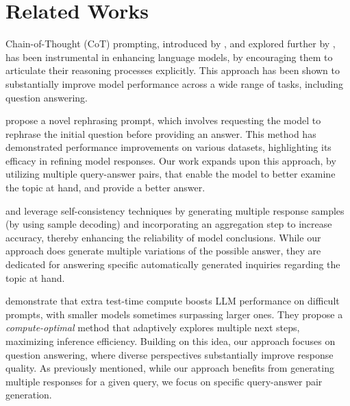 \section{Related Works}
\label{sec:related-works}

Chain-of-Thought (CoT) prompting, introduced by \citet{wu-etal-2023-chain}, and explored further by \citet{weiChainofThoughtPromptingElicits2023}, has been instrumental in enhancing language models, by encouraging them to articulate their reasoning processes explicitly. This approach has been shown to substantially improve model performance across a wide range of tasks, including question answering. 

\citet{dengRephraseRespondLet2024} propose a novel rephrasing prompt, which involves requesting the model to rephrase the initial question before providing an answer. This method has demonstrated performance improvements on various datasets, highlighting its efficacy in refining model responses. Our work expands upon this approach, by utilizing multiple query-answer pairs, that enable the model to better examine the topic at hand, and provide a better answer.

\citet{wangSelfConsistencyImprovesChain2023} and \citet{chenUniversalSelfConsistencyLarge2023} leverage self-consistency techniques by generating multiple response samples (by using sample decoding) and incorporating an aggregation step to increase accuracy, thereby enhancing the reliability of model conclusions. While our approach does generate multiple variations of the possible answer, they are dedicated for answering specific automatically generated inquiries regarding the topic at hand.

\citet{snellScalingLLMTestTime2024} demonstrate that extra test-time compute boosts LLM performance on difficult prompts, with smaller models sometimes surpassing larger ones. They propose a \textit{compute-optimal} method that adaptively explores multiple next steps, maximizing inference efficiency. Building on this idea, our approach focuses on question answering, where diverse perspectives substantially improve response quality. As previously mentioned, while our approach benefits from generating multiple responses for a given query, we focus on specific query-answer pair generation.   
